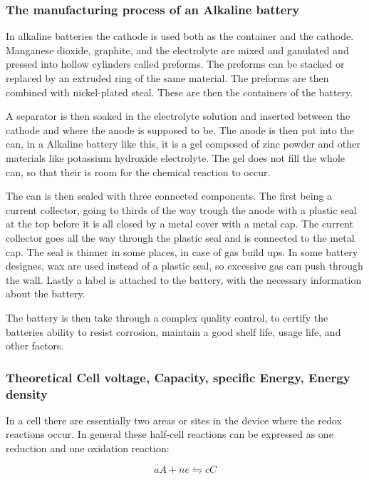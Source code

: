 \subsubsection{The manufacturing process of an Alkaline battery}
In alkaline batteries the cathode is used both as the container and the cathode. Manganese dioxide, graphite, and the electrolyte are mixed and ganulated and pressed into hollow cylinders called preforms. The preforms can be stacked or replaced by an extruded ring of the same material. The preforms are then combined with nickel-plated steal. These are then the containers of the battery. 

A separator is then soaked in the electrolyte solution and inserted between the cathode and where the anode is supposed to be. The anode is then put into the can, in a Alkaline battery like this, it is a gel composed of zinc powder and other materials like potassium hydroxide electrolyte. The gel does not fill the whole can, so that their is room for the chemical reaction to occur. 

The can is then sealed with three connected components. The first being a current collector, going to thirds of the way trough the anode with a plastic seal at the top before it is all closed by a metal cover with a metal cap. The current collector goes all the way through the plastic seal and is connected to the metal cap. The seal is thinner in some places, in case of gas build ups. In some battery designes, wax are used instead of a plastic seal, so excessive gas can push through the wall. Lastly a label is attached to the battery, with the necessary information about the battery. 

The battery is then take through a complex quality control, to certify the batteries ability to resist corrosion, maintain a good shelf life, usage life, and other factors. 





\subsubsection{Theoretical Cell voltage, Capacity, specific Energy, Energy density}\label{sec:msp}
	
	In a cell there are essentially two areas or sites in the device where the redox reactions occur. In general these half-cell reactions can be expressed as one reduction and one oxidation reaction:
	
	$$aA + ne \leftrightharpoons cC $$
	
